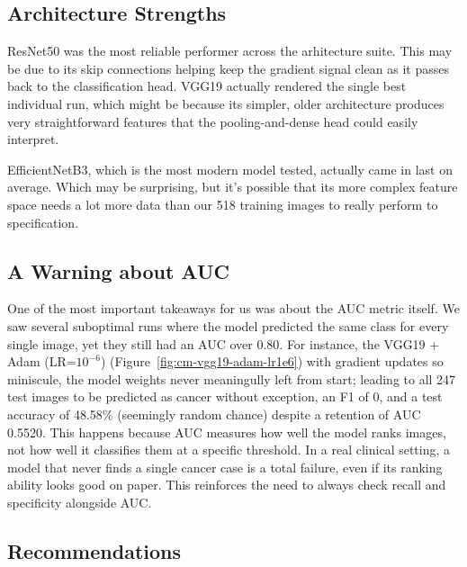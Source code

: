 \subsection{Architecture Strengths}

ResNet50 was the most reliable performer across the arhitecture suite. This may be due to its skip connections helping keep the gradient signal clean as it passes back to the classification head. VGG19 actually rendered the single best individual run, which might be because its simpler, older architecture produces very straightforward features that the pooling-and-dense head could easily interpret. 

EfficientNetB3, which is the most modern model tested, actually came in last on average. Which may be surprising, but it's possible that its more complex feature space needs a lot more data than our 518 training images to really perform to specification.

\subsection{A Warning about AUC}

One of the most important takeaways for us was about the AUC metric itself. We saw several suboptimal runs where the model predicted the same class for every single image, yet they still had an AUC over 0.80. For instance, the VGG19 + Adam (LR=$10^{-6}$) (Figure~\ref{fig:cm-vgg19-adam-lr1e6}) with gradient updates so miniscule, the model weights never meaningully left from start; leading to all 247 test images to be predicted as cancer without exception, an F1 of 0, and a test accuracy of 48.58\% (seemingly random chance) despite a retention of AUC 0.5520. This happens because AUC measures how well the model ranks images, not how well it classifies them at a specific threshold. In a real clinical setting, a model that never finds a single cancer case is a total failure, even if its ranking ability looks good on paper. This reinforces the need to always check recall and specificity alongside AUC.

\subsection{Recommendations}

